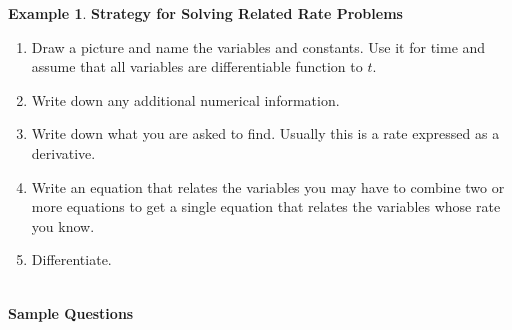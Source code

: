 \documentclass[11pt,a4paper]{article}
\theoremstyle{definition}
\newtheorem{example}[thm]{Example}
\begin{document}
\begin{example}
\textbf{Strategy for Solving Related Rate Problems}
\begin{enumerate}
\item Draw a picture and name the variables and constants. Use it for time and assume that all variables are differentiable function to $t$.
\item Write down any additional numerical information.
\item Write down what you are asked to find. Usually this is a rate expressed as a derivative.
\item Write an equation that relates the variables you may have to combine two or more equations to get a single equation that relates the variables whose rate you know.
\item Differentiate.\\\\
\end{enumerate}
\end{example}
\textbf{Sample Questions}
\end{document}
